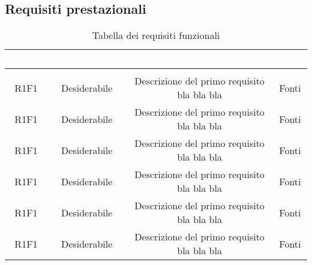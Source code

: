 \subsection{Requisiti prestazionali}
\renewcommand{\arraystretch}{1.5}
\begin{center}
\begin{longtable}{C{\colA} C{\colB} C{\colC} C{\colA}}
		\textcolor{white}{\textbf{Codice}} & 
		\textcolor{white}{\textbf{Classificazione}} & 
		\textcolor{white}{\textbf{Descrizione}} & 
		\textcolor{white}{\textbf{Fonti}} \\
		\endfirsthead
	    \\
	    \endfoot
	    \caption{Tabella dei requisiti funzionali}
	    \endlastfoot

R1F1 & Desiderabile & Descrizione del primo requisito bla bla bla & Fonti \\
R1F1 & Desiderabile & Descrizione del primo requisito bla bla bla & Fonti \\
R1F1 & Desiderabile & Descrizione del primo requisito bla bla bla & Fonti \\
R1F1 & Desiderabile & Descrizione del primo requisito bla bla bla & Fonti \\
R1F1 & Desiderabile & Descrizione del primo requisito bla bla bla & Fonti \\
R1F1 & Desiderabile & Descrizione del primo requisito bla bla bla & Fonti \\
\end{longtable}
\end{center}